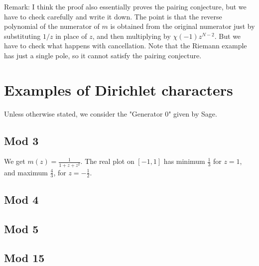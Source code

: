\documentclass[a4paper]{amsart}
\begin{document}
Remark: I think the proof also essentially proves the pairing conjecture, but we have to check carefully and write it down. The point is that the reverse polynomial of the numerator of $m$ is obtained from the original numerator just by substituting $1/z$ in place of $z$, and then multiplying by $\chi(-1) z^{N-2}$. But we have to check what happens with cancellation. Note that the Riemann example has just a single pole, so it cannot satisfy the pairing conjecture.

\section{Examples of Dirichlet characters}

Unless otherwise stated, we consider the "Generator 0" given by Sage.

\subsection{Mod 3}

We get $m(z) = \frac{1}{1+z+z^2}$. The real plot on $[-1, 1]$ has minimum $\frac{1}{3}$ for $z=1$, and maximum $\frac{4}{3}$, for $z=-\frac{1}{2}$.

\subsection{Mod 4}



\subsection{Mod 5}


\subsection{Mod 15}
\end{document}
